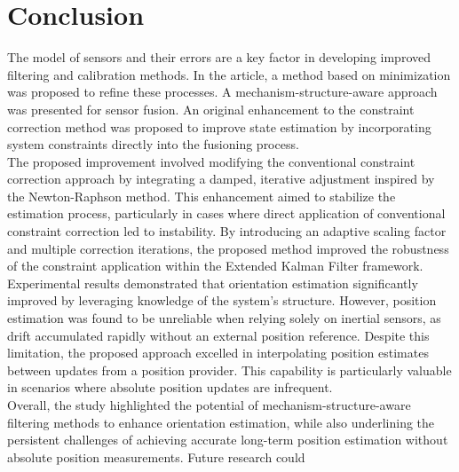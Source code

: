 \newpage
\section{Conclusion}
\label{sec:conclusions}

The model of sensors and their errors are a key factor in developing improved filtering and calibration methods. In the article, a method based on minimization was proposed to refine these processes. A mechanism-structure-aware approach was presented for sensor fusion. An original enhancement to the constraint correction method was proposed to improve state estimation by incorporating system constraints directly into the fusioning process. \\

The proposed improvement involved modifying the conventional constraint correction approach by integrating a damped, iterative adjustment inspired by the Newton-Raphson method. This enhancement aimed to stabilize the estimation process, particularly in cases where direct application of conventional constraint correction led to instability. By introducing an adaptive scaling factor and multiple correction iterations, the proposed method improved the robustness of the constraint application within the Extended Kalman Filter framework.\\

Experimental results demonstrated that orientation estimation significantly improved by leveraging knowledge of the system’s structure. However, position estimation was found to be unreliable when relying solely on inertial sensors, as drift accumulated rapidly without an external position reference. Despite this limitation, the proposed approach excelled in interpolating position estimates between updates from a position provider. This capability is particularly valuable in scenarios where absolute position updates are infrequent.\\

Overall, the study highlighted the potential of mechanism-structure-aware filtering methods to enhance orientation estimation, while also underlining the persistent challenges of achieving accurate long-term position estimation without absolute position measurements. Future research could


